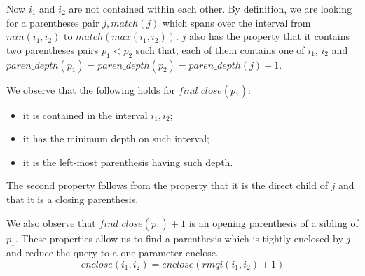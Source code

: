 Now $i_1$ and $i_2$ are not contained within each other.
By definition, we are looking for a parentheses pair $j, match(j)$ which spans over the interval from $min(i_1, i_2)$ to $match(max(i_1, i_2))$.
$j$ also has the property that it contains two parentheses pairs $p_1 < p_2$ such that, each of them contains one of $i_1$, $i_2$ and $paren\_depth(p_1) = paren\_depth(p_2) = paren\_depth(j) + 1$.

We observe that the following holds for $find\_close(p_1)$:
\begin{itemize}
	\item it is contained in the interval $i_1, i_2$;
	\item it has the minimum depth on such interval;
	\item it is the left-most parenthesis having such depth.
\end{itemize}
The second property follows from the property that it is the direct child of $j$ and that it is a closing parenthesis.

We also observe that $find\_close(p_1) + 1$ is an opening parenthesis of a sibling of $p_1$.
These properties allow us to find a parenthesis which is tightly enclosed by $j$ and reduce the query to a one-parameter enclose.
$$ enclose(i_1, i_2) = enclose(rmqi(i_1, i_2) + 1) $$
